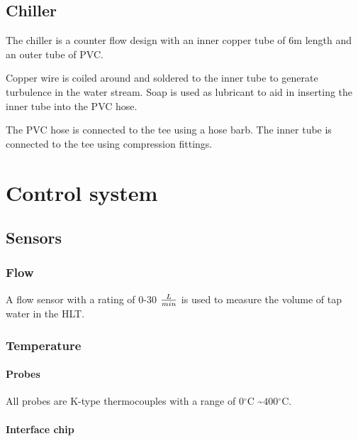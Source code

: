 \documentclass[11pt,fleqn]{book} %
\newcommand{\degree}{\ensuremath{^\circ}}
\begin{document}
\section{Chiller}

The chiller is a counter flow design with an inner copper tube of 6m length and an outer tube of PVC.

Copper wire is coiled around and soldered to the inner tube to generate turbulence in the water stream. Soap is used as lubricant to aid in inserting the inner tube into the PVC hose.

The PVC hose is connected to the tee using a hose barb. The inner tube is connected to the tee using compression fittings.



\chapter{Control system}

\section{Sensors}

\subsection{Flow}

A flow sensor with a rating of 0-30 $L \over min$ is used to measure the volume of tap water in the HLT.

\subsection{Temperature}

\subsubsection{Probes}

All probes are K-type thermocouples with a range of $0\degree$C \textasciitilde $400\degree$C.

\subsubsection{Interface chip}
\end{document}
